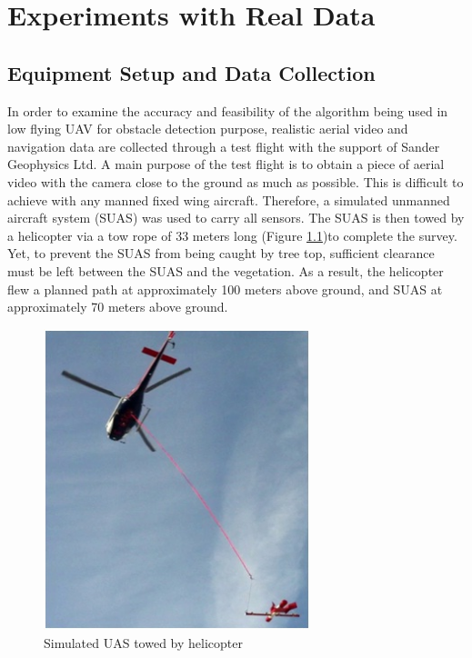 \chapter{Experiments with Real Data}
\section{Equipment Setup and Data Collection}
In order to examine the accuracy and feasibility of the algorithm
being used in low flying UAV for obstacle detection purpose, realistic
aerial video and navigation data are collected through a test flight
with the support of Sander Geophysics Ltd. A main purpose of the test
flight is to obtain a piece of aerial video with the camera close to
the ground as much as possible. This is difficult to achieve with any
manned fixed wing aircraft. Therefore, a simulated unmanned aircraft
system (SUAS) was used to carry all sensors. The SUAS is then towed by
a helicopter via a tow rope of 33 meters long (Figure
\ref{fig:towedSUAS})to complete the survey. Yet, to prevent the SUAS
from being caught by tree top, sufficient clearance must be left
between the SUAS and the vegetation. As a result, the helicopter flew
a planned path at approximately 100 meters above ground, and SUAS at
approximately 70 meters above ground.

\begin{figure}[h]
\centering
\includegraphics[width=7.75cm,keepaspectratio=true]{./Figures/towed_SUAS.jpg}
\caption{Simulated UAS towed by helicopter}
\label{fig:towedSUAS}
\end{figure}

